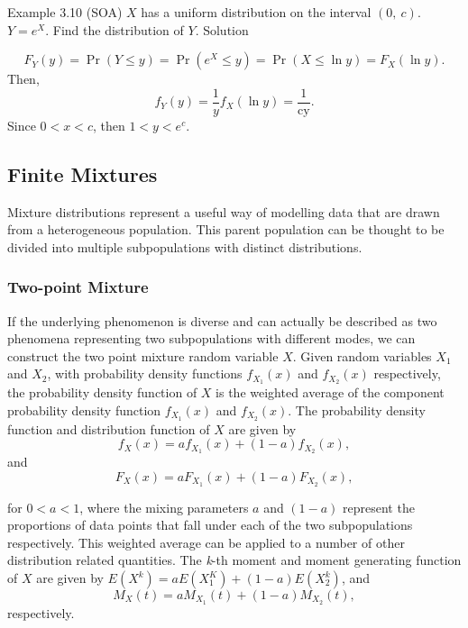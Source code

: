 \documentclass[]{book}
\theoremstyle{definition}
\theoremstyle{definition}
\theoremstyle{definition}
\theoremstyle{remark}
\begin{document}
Example 3.10 (SOA) \(X\) has a uniform distribution on the interval
\((0,\ c)\). \(Y = e^{X}\). Find the distribution of \(Y\). Solution

\[F_{Y}\left( y \right) = \Pr\left( Y \leq y \right) = \Pr\left( e^{X} \leq y \right) = \Pr\left( X \leq \ln y \right) = F_{X}\left( \ln y \right).\]
Then,
\[f_{Y}\left( y \right) = \frac{1}{y}f_{X}\left(\ln y \right) = \frac{1}{\text{cy}}. \]
Since \(0 < x < c\), then \(1 < y < e^{c}\).

\subsection{Finite Mixtures}\label{finite-mixtures}

Mixture distributions represent a useful way of modelling data that are
drawn from a heterogeneous population. This parent population can be
thought to be divided into multiple subpopulations with distinct
distributions.

\subsubsection{Two-point Mixture}\label{two-point-mixture}

If the underlying phenomenon is diverse and can actually be described as
two phenomena representing two subpopulations with different modes, we
can construct the two point mixture random variable \(X\). Given random
variables \(X_{1}\) and \(X_{2}\), with probability density functions
\(f_{X_{1}}\left( x \right)\) and \(f_{X_{2}}\left( x \right)\)
respectively, the probability density function of \(X\) is the weighted
average of the component probability density function
\(f_{X_{1}}\left( x \right)\) and \(f_{X_{2}}\left( x \right)\). The
probability density function and distribution function of \(X\) are
given by
\[f_{X}\left( x \right) = af_{X_{1}}\left( x \right) + \left( 1 - a \right)f_{X_{2}}\left( x \right),\]
and
\[F_{X}\left( x \right) = aF_{X_{1}}\left( x \right) + \left( 1 - a \right)F_{X_{2}}\left( x \right),\]

for \(0 < a <1\), where the mixing parameters \(a\) and \((1 - a)\)
represent the proportions of data points that fall under each of the two
subpopulations respectively. This weighted average can be applied to a
number of other distribution related quantities. The \emph{k}-th moment
and moment generating function of \(X\) are given by
\(E\left( X^{k} \right) = aE\left( X_{1}^{K} \right) + \left( 1 - a \right)E\left( X_{2}^{k} \right)\),
and
\[M_{X}\left( t \right) = aM_{X_{1}}\left( t \right) + \left( 1 - a \right)M_{X_{2}}\left( t \right),\]
respectively.
\end{document}

